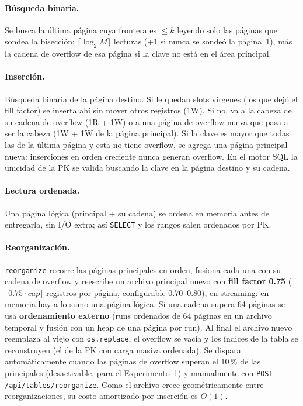 \documentclass[11pt,a4paper]{article}
\newcommand{\code}[1]{\texttt{#1}}
\begin{document}
\paragraph{Búsqueda binaria.} Se busca la última página cuya frontera es $\le k$ leyendo solo las
páginas que sondea la bisección: $\lceil\log_2 M\rceil$ lecturas (+1 si nunca se sondeó la página~1),
más la cadena de overflow de esa página si la clave no está en el área principal.

\paragraph{Inserción.} Búsqueda binaria de la página destino. Si le quedan slots vírgenes (los que
dejó el fill factor) se inserta ahí sin mover otros registros (1W). Si no, va a la cabeza de su cadena
de overflow (1R + 1W) o a una página de overflow nueva que pasa a ser la cabeza (1W + 1W de la página
principal). Si la clave es mayor que todas las de la última página y esta no tiene overflow, se agrega
una página principal nueva: inserciones en orden creciente nunca generan overflow. En el motor SQL la
unicidad de la PK se valida buscando la clave en la página destino y su cadena.

\paragraph{Lectura ordenada.} Una página lógica (principal + su cadena) se ordena en memoria antes
de entregarla, sin I/O extra; así \code{SELECT} y los rangos salen ordenados por PK.

\paragraph{Reorganización.} \code{reorganize} recorre las páginas principales en orden, fusiona cada
una con su cadena de overflow y reescribe un archivo principal nuevo con \textbf{fill factor 0.75}
($\lfloor 0.75\cdot cap\rfloor$ registros por página, configurable 0.70--0.80), en streaming: en memoria
hay a lo sumo una página lógica. Si una cadena supera 64 páginas se usa \textbf{ordenamiento externo}
(runs ordenados de 64 páginas en un archivo temporal y fusión con un heap de una página por run). Al
final el archivo nuevo reemplaza al viejo con \code{os.replace}, el overflow se vacía y los índices de
la tabla se reconstruyen (el de la PK con carga masiva ordenada). Se dispara automáticamente cuando las
páginas de overflow superan el 10\,\% de las principales (desactivable, para el Experimento~1) y
manualmente con \code{POST /api/tables/reorganize}. Como el archivo crece geométricamente entre
reorganizaciones, su costo amortizado por inserción es $O(1)$.
\end{document}
